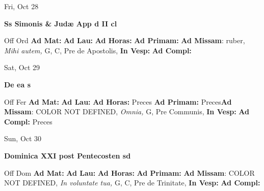 \documentclass[10pt]{memoir}
\begin{document}
\begin{center}
\begin{minipage}{3.5in}
\vspace{2em}
\begin{center}Fri, Oct 28
\end{center}
\textbf{ \large Ss Simonis \& Judæ App
\textnormal{\normalsize d II cl}}

\begin{justify}Off Ord
\textbf{Ad Mat: }
\textbf{Ad Lau: }
\textbf{Ad Horas: }
\textbf{Ad Primam: }\textbf{Ad Missam}: ruber, \textit{Mihi autem,} G, C, Pre de Apostolis, 
\textbf{In Vesp: }
\textbf{Ad Compl: }
\end{justify}
\end{minipage}
\end{center}

\begin{center}
\begin{minipage}{3.5in}
\vspace{2em}
\begin{center}Sat, Oct 29
\end{center}
\textbf{ \large De ea
\textnormal{\normalsize s}}

\begin{justify}Off Fer
\textbf{Ad Mat: }
\textbf{Ad Lau: }
\textbf{Ad Horas: }Preces
\textbf{Ad Primam: }Preces\textbf{Ad Missam}: COLOR NOT DEFINED, \textit{Omnia,} G, Pre Communis, 
\textbf{In Vesp: }
\textbf{Ad Compl: }Preces
\end{justify}
\end{minipage}
\end{center}

\begin{center}
\begin{minipage}{3.5in}
\vspace{2em}
\begin{center}Sun, Oct 30
\end{center}
\textbf{ \large Dominica XXI post Pentecosten
\textnormal{\normalsize sd}}

\begin{justify}Off Dom
\textbf{Ad Mat: }
\textbf{Ad Lau: }
\textbf{Ad Horas: }
\textbf{Ad Primam: }\textbf{Ad Missam}: COLOR NOT DEFINED, \textit{In voluntate tua,} G, C, Pre de Trinitate, 
\textbf{In Vesp: }
\textbf{Ad Compl: }
\end{justify}
\end{minipage}
\end{center}
\end{document}
